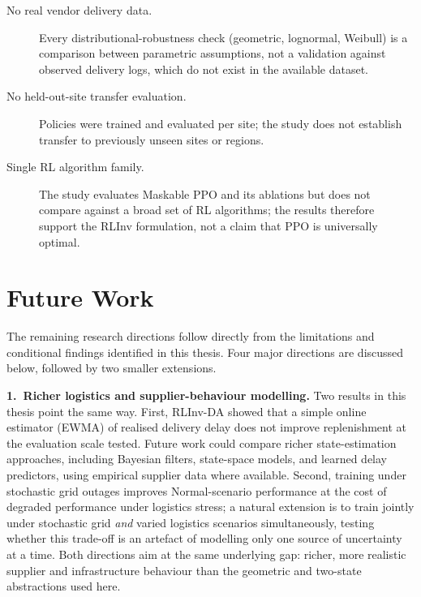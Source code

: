 \begin{description}
  \item[No real vendor delivery data.] Every distributional-robustness
  check (geometric, lognormal, Weibull) is a comparison between
  parametric assumptions, not a validation against observed delivery
  logs, which do not exist in the available dataset.

  \item[No held-out-site transfer evaluation.] Policies were trained
  and evaluated per site; the study does not establish transfer to
  previously unseen sites or regions.

  \item[Single RL algorithm family.] The study evaluates Maskable PPO
  and its ablations but does not compare against a broad set of RL
  algorithms; the results therefore support the RLInv formulation, not
  a claim that PPO is universally optimal.

\end{description}

\section{Future Work}
\label{sec:conclusion_future}

The remaining research directions follow directly from the
limitations and conditional findings identified in this thesis. Four
major directions are discussed below, followed by two smaller
extensions.

\textbf{1.\ Richer logistics and supplier-behaviour modelling.} Two
results in this thesis point the same way. First, RLInv-DA showed that
a simple online estimator (EWMA) of realised delivery delay does not
improve replenishment at the evaluation scale tested. Future work could
compare richer state-estimation approaches, including Bayesian filters,
state-space models, and learned delay predictors, using empirical
supplier data where available.
Second, training under stochastic grid outages improves Normal-scenario
performance at the cost of degraded performance under logistics stress;
a natural extension is to train jointly under stochastic grid
\emph{and} varied logistics scenarios simultaneously, testing whether
this trade-off is an artefact of modelling only one source of
uncertainty at a time. Both directions aim at the same underlying gap:
richer, more realistic supplier and infrastructure behaviour than the
geometric and two-state abstractions used here.

